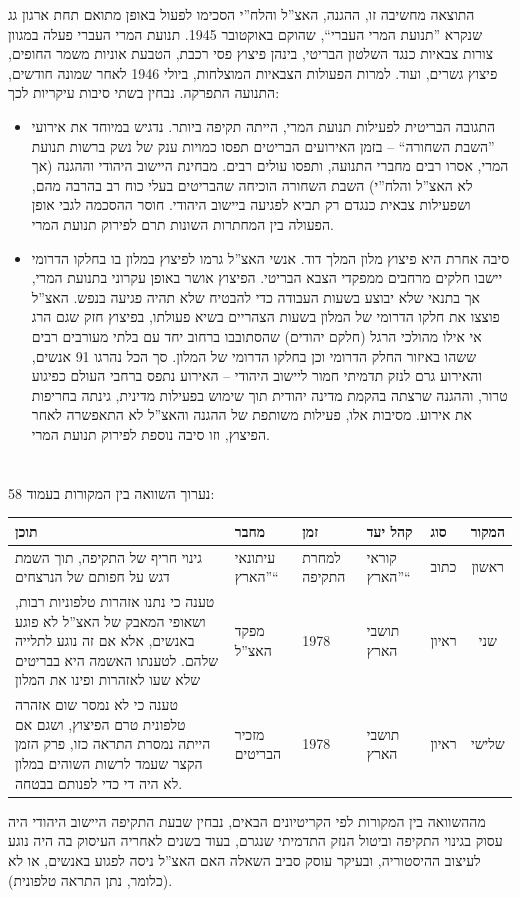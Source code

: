 \documentclass[]{../../../../tex/classes/homework}
\begin{document}
	התוצאה מחשיבה זו, ההגנה, האצ''ל והלח''י הסכימו לפעול באופן מתואם תחת ארגון גג שנקרא ''תנועת המרי העברי``, שהוקם באוקטובר 1945. תנועת המרי העברי פעלה במגוון צורות צבאיות כנגד השלטון הבריטי, בינהן פיצוץ פסי רכבת, הטבעת אוניות משמר החופים, פיצוץ גשרים, ועוד. למרות הפעולות הצבאיות המוצלחות, ביולי 1946 לאחר שמונה חודשים, התנועה התפרקה. נבחין בשתי סיבות עיקריות לכך: 
	\begin{itemize}
		\item התגובה הבריטית לפעילות תנועת המרי, הייתה תקיפה ביותר. נדגיש במיוחד את אירועי ''השבת השחורה`` – בזמן האירועים הבריטים תפסו כמויות ענק של נשק ברשות תנועת המרי, אסרו רבים מחברי התנועה, ותפסו עולים רבים. מבחינת היישוב היהודי וההגנה (אך לא האצ''ל והלח''י) השבת השחורה הוכיחה שהבריטים בעלי כוח רב בהרבה מהם, ושפעילות צבאית כנגדם רק תביא לפגיעה ביישוב היהודי. חוסר ההסכמה לגבי אופן הפעולה בין המחתרות השונות תרם לפירוק תנועת המרי. 
		\item סיבה אחרת היא פיצוץ מלון המלך דוד. אנשי האצ''ל גרמו לפיצוץ במלון בו בחלקו הדרומי יישבו חלקים מרחבים ממפקדי הצבא הבריטי. הפיצוץ אושר באופן עקרוני בתנועת המרי, אך בתנאי שלא יבוצע בשעות העבודה כדי להבטיח שלא תהיה פגיעה בנפש. האצ''ל פוצצו את חלקו הדרומי של המלון בשעות הצהריים בשיא פעולתו, בפיצוץ חזק שגם הרג אי אילו מהולכי הרגל (חלקם יהודים) שהסתובבו ברחוב יחד עם בלתי מעורבים רבים ששהו באיזור החלק הדרומי וכן בחלקו הדרומי של המלון. סך הכל נהרגו 91 אנשים, והאירוע גרם לנזק תדמיתי חמור ליישוב היהודי – האירוע נתפס ברחבי העולם כפיגוע טרור, וההגנה שרצתה בהקמת מדינה יהודית תוך שימוש בפעילות מדינית, גינתה בחריפות את אירוע. מסיבות אלו, פעילות משותפת של ההגנה והאצ''ל לא התאפשרה לאחר הפיצוץ, וזו סיבה נוספת לפירוק תנועת המרי. 
	\end{itemize}
	
	\section{}
	
	נערוך השוואה בין המקורות בעמוד 58: 
	
	\begin{tabularx}{\linewidth}{|X|l|l|l|l|c|}
		\hline תוכן & מחבר & זמן & קהל יעד & סוג &המקור  \\
		\hline גינוי חריף של התקיפה, תוך השמת דגש על חפותם של הנרצחים 
		 & עיתונאי ''הארץ`` & למחרת התקיפה & קוראי ''הארץ`` & כתוב & ראשון \\
		\hline טענה כי נתנו אזהרות טלפוניות רבות, ושאופי המאבק של האצ''ל לא פוגע באנשים, אלא אם זה נוגע לתלייה שלהם. לטענתו האשמה היא בבריטים שלא שעו לאזהרות ופינו את המלון & מפקד האצ''ל & 1978 & תושבי הארץ & ראיון & שני \\
		\hline טענה כי לא נמסר שום אזהרה טלפונית טרם הפיצוץ, ושגם אם הייתה נמסרת התראה כזו, פרק הזמן הקצר שעמד לרשות השוהים במלון לא היה די כדי לפנותם בבטחה. & מזכיר הבריטים & 1978 & תושבי הארץ & ראיון &שלישי \\
		\hline
	\end{tabularx}
	מההשוואה בין המקורות לפי הקריטיונים הבאים, נבחין שבעת התקיפה היישוב היהודי היה עסוק בגינוי התקיפה וביטול הנזק התדמיתי שנגרם, בעוד בשנים לאחריה העיסוק בה היה נוגע לעיצוב ההיסטוריה, ובעיקר עוסק סביב השאלה האם האצ''ל ניסה לפגוע באנשים, או לא (כלומר, נתן התראה טלפונית). 
\end{document}
